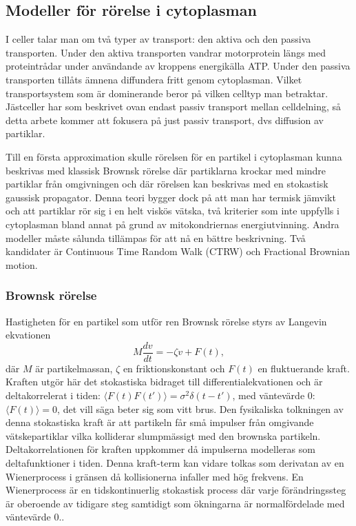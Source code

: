 \subsection{Modeller för rörelse i cytoplasman}

I celler talar man om två typer av transport: den aktiva och den passiva transporten. Under den aktiva transporten vandrar motorprotein längs med proteintrådar under användande av kroppens energikälla ATP. Under den passiva transporten tillåts ämnena diffundera fritt genom cytoplasman. Vilket transportsystem som är dominerande beror på vilken celltyp man betraktar. Jästceller har som beskrivet ovan endast passiv transport mellan celldelning, så detta arbete kommer att fokusera på just passiv transport, dvs diffusion av partiklar.

Till en första approximation skulle rörelsen för en partikel i cytoplasman kunna beskrivas med klassisk Brownsk rörelse där partiklarna krockar med mindre partiklar från omgivningen och där rörelsen kan beskrivas med en stokastisk gaussisk propagator. Denna teori bygger dock på att man har termisk jämvikt och att partiklar rör sig i en helt viskös vätska, två kriterier som inte uppfylls i cytoplasman bland annat på grund av mitokondriernas energiutvinning. Andra modeller måste sålunda tillämpas för att nå en bättre beskrivning. Två kandidater är Continuous Time Random Walk (CTRW) och Fractional Brownian motion.


\subsubsection{Brownsk rörelse}

Hastigheten för en partikel som utför ren Brownsk rörelse styrs av Langevin ekvationen
\begin{equation} \label{eq:Brownian_SDE}
    M\frac{dv}{dt}=-\zeta v + F(t),
\end{equation}
där $M$ är partikelmassan, $\zeta$ en friktionskonstant och $F(t)$ en fluktuerande kraft. \cite{Brownian_Mazo} Kraften utgör här det stokastiska bidraget till differentialekvationen och är deltakorrelerat i tiden:  $\langle{F(t)} F(t')\rangle=\sigma^2\delta(t-t')$, med väntevärde 0: $\langle{F(t)}\rangle=0$, det vill säga beter sig som vitt brus. Den fysikaliska tolkningen av denna stokastiska kraft är att partikeln får små impulser från omgivande vätskepartiklar vilka kolliderar slumpmässigt med den brownska partikeln.  Deltakorrelationen för kraften uppkommer då impulserna modelleras som deltafunktioner i tiden. Denna kraft-term kan vidare tolkas som derivatan av en Wienerprocess i gränsen då kollisionerna infaller med hög frekvens. En Wienerprocess är en tidskontinuerlig stokastisk process där varje förändringssteg är oberoende av tidigare steg samtidigt som ökningarna är normalfördelade med väntevärde 0..

